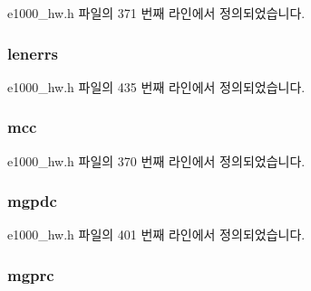 e1000\+\_\+hw.\+h 파일의 371 번째 라인에서 정의되었습니다.

\subsubsection[{\texorpdfstring{lenerrs}{lenerrs}}]{ lenerrs}\hypertarget{structe1000__hw__stats_a7934571eacac1d526df4bcc2ca47a105}{}\label{structe1000__hw__stats_a7934571eacac1d526df4bcc2ca47a105}


e1000\+\_\+hw.\+h 파일의 435 번째 라인에서 정의되었습니다.

\subsubsection[{\texorpdfstring{mcc}{mcc}}]{ mcc}\hypertarget{structe1000__hw__stats_af9ca4a335a435ed3cfa526fb115de646}{}\label{structe1000__hw__stats_af9ca4a335a435ed3cfa526fb115de646}


e1000\+\_\+hw.\+h 파일의 370 번째 라인에서 정의되었습니다.

\subsubsection[{\texorpdfstring{mgpdc}{mgpdc}}]{ mgpdc}\hypertarget{structe1000__hw__stats_a8e44d6870690ac6800593045c65d7a07}{}\label{structe1000__hw__stats_a8e44d6870690ac6800593045c65d7a07}


e1000\+\_\+hw.\+h 파일의 401 번째 라인에서 정의되었습니다.

\subsubsection[{\texorpdfstring{mgprc}{mgprc}}]{ mgprc}\hypertarget{structe1000__hw__stats_a849ab56a7d8878c0dfa5f0a51ced4c32}{}\label{structe1000__hw__stats_a849ab56a7d8878c0dfa5f0a51ced4c32}


